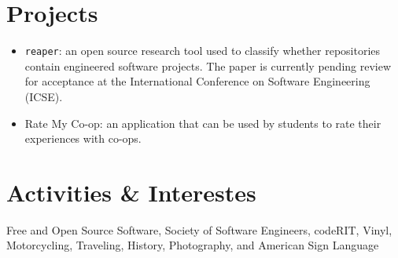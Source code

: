 \documentclass[margin, 10pt]{res}
\begin{document}
\begin{resume}
\section{Projects}

\begin{itemize}
    \item \texttt{reaper}: an open source research tool used to classify
          whether repositories contain engineered software projects. The paper
          is currently pending review for acceptance at the International
          Conference on Software Engineering (ICSE).
    \item Rate My Co-op: an application that can be used by students to rate
          their experiences with co-ops.
\end{itemize}

\section{Activities \& Interestes} 

Free and Open Source Software, Society of Software Engineers, codeRIT, Vinyl,
Motorcycling, Traveling, History, Photography, and American Sign Language

\end{resume}
\end{document}
